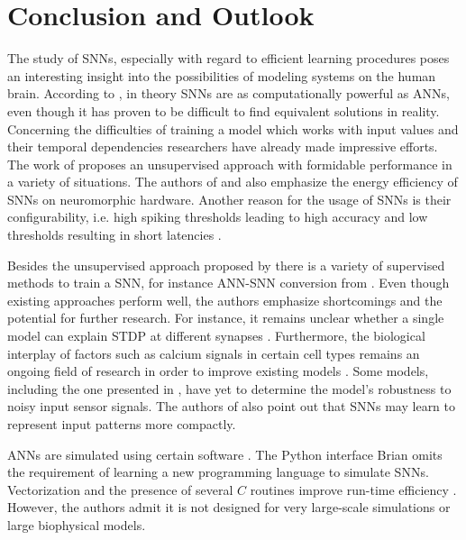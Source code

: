 \section{Conclusion and Outlook}
\label{sec:conclusion}

The study of \acp{SNN}, especially with regard to efficient learning procedures poses an interesting insight into the possibilities of modeling
systems on the human brain.
According to \cite{ANN_SNN_conversion}, in theory \acp{SNN} are as computationally powerful as \acp{ANN}, 
even though it has proven to be difficult to find equivalent solutions in reality.
Concerning the difficulties of training a model which works with input values and their temporal dependencies researchers have already made 
impressive efforts.
The work of \cite{SNN} proposes an unsupervised approach with formidable performance in a variety of situations.
The authors of \cite{SNN} and \cite{Synaptic_plasticity} also emphasize the energy efficiency of \acp{SNN} on neuromorphic hardware.
Another reason for the usage of \acp{SNN} is their configurability, 
i.e. high spiking thresholds leading to high accuracy and low thresholds resulting in short latencies \cite{ANN_SNN_conversion}.

Besides the unsupervised approach proposed by \cite{SNN} there is a variety of supervised methods to train a \ac{SNN}, 
for instance \ac{ANN}-\ac{SNN} conversion from \cite{DIET_SNN}.
Even though existing approaches perform well, the authors emphasize shortcomings and the potential for further research.
For instance, it remains unclear whether a single model can explain \ac{STDP} at different synapses \cite{STDP_hebbian}.
Furthermore, the biological interplay of factors such as calcium signals in certain cell types remains an ongoing field of research 
in order to improve existing models \cite{STDP_hebbian}.
Some models, including the one presented in \cite{object_detection_SNN}, have yet to determine the model's robustness to noisy input sensor signals.
The authors of \cite{object_detection_SNN} also point out that \acp{SNN} may learn to represent input patterns more compactly.

\Acp{ANN} are simulated using certain software \cite{simulation_Brian}.
The Python interface Brian omits the requirement of learning a new programming language to simulate \acp{SNN}.
Vectorization and the presence of several $C$ routines improve run-time efficiency \cite{simulation_Brian}.
However, the authors admit it is not designed for very large-scale simulations or large biophysical models.

